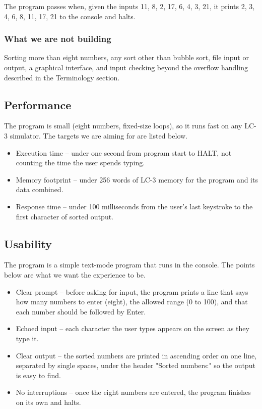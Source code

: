 \documentclass[11pt]{article}
\begin{document}
The program passes when, given the inputs 11, 8, 2, 17, 6, 4, 3, 21, it prints 2, 3, 4, 6, 8, 11, 17, 21 to the console and halts.


\subsubsection*{What we are not building}

Sorting more than eight numbers, any sort other than bubble sort, file input or output, a graphical interface, and input checking beyond the overflow handling described in the Terminology section.


\subsection*{Performance}

The program is small (eight numbers, fixed-size loops), so it runs fast on any LC-3 simulator. The targets we are aiming for are listed below.


\begin{itemize}
  \item Execution time -- under one second from program start to HALT, not counting the time the user spends typing.
  \item Memory footprint -- under 256 words of LC-3 memory for the program and its data combined.
  \item Response time -- under 100 milliseconds from the user's last keystroke to the first character of sorted output.
\end{itemize}

\subsection*{Usability}

The program is a simple text-mode program that runs in the console. The points below are what we want the experience to be.


\begin{itemize}
  \item Clear prompt -- before asking for input, the program prints a line that says how many numbers to enter (eight), the allowed range (0 to 100), and that each number should be followed by Enter.
  \item Echoed input -- each character the user types appears on the screen as they type it.
  \item Clear output -- the sorted numbers are printed in ascending order on one line, separated by single spaces, under the header "Sorted numbers:" so the output is easy to find.
  \item No interruptions -- once the eight numbers are entered, the program finishes on its own and halts.
\end{itemize}
\end{document}
